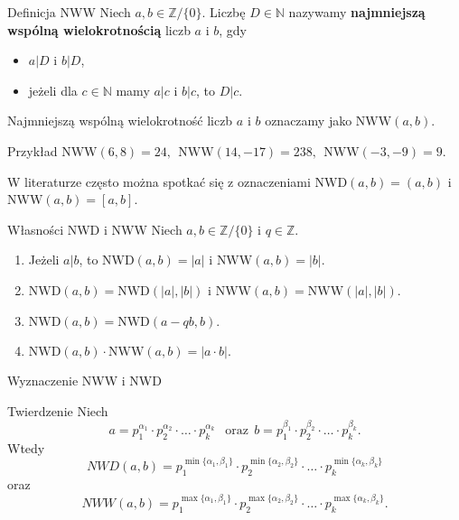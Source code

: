 \documentclass[a4paper,10pt]{beamer}
\begin{document}
\begin{frame}
	
	\begin{block}{Definicja NWW}
		Niech $a,b\in\mathbb{Z}/\{0\}$. Liczbę $D\in\mathbb{N}$ nazywamy {\bf najmniejszą wspólną wielokrotnością} liczb $a$ i $b$, gdy
		\begin{itemize}
			\item $a|D$ i $b|D$,
			\item jeżeli dla $c\in\mathbb{N}$ mamy $a|c$ i $b|c$, to $D|c$.
		\end{itemize}
	\end{block}
	
	Najmniejszą wspólną wielokrotność liczb $a$ i $b$ oznaczamy jako $\mbox{NWW}(a,b)$.
	
	\begin{exampleblock}{Przykład}
		$\mbox{NWW}(6,8)=24,\ \ \mbox{NWW}(14,-17)=238,\ \ \mbox{NWW}(-3,-9)=9.$
	\end{exampleblock}

	\begin{block}
				
		W literaturze często można spotkać się z oznaczeniami $\mbox{NWD}(a,b)=(a,b)$ i~$\mbox{NWW}(a,b)=[a,b]$.		
	\end{block}
	
\end{frame}



\begin{frame}
	
	\begin{block}{Własności NWD i NWW}
		Niech $a,b\in\mathbb{Z}/\{0\}$ i $q\in\mathbb{Z}$.
		\begin{enumerate}
			\item Jeżeli $a|b$, to $\mbox{NWD}(a,b)=|a|$ i $\mbox{NWW}(a,b)=|b|$.
			\item $\mbox{NWD}(a,b)=\mbox{NWD}(|a|,|b|)$ i $\mbox{NWW}(a,b)=\mbox{NWW}(|a|,|b|)$.
			\item $\mbox{NWD}(a,b)=\mbox{NWD}(a-qb,b)$.
			\item\label{mno} $\mbox{NWD}(a,b)\cdot\mbox{NWW}(a,b)=|a\cdot b|.$
		\end{enumerate}
	\end{block}
	
\end{frame}


\begin{frame}{Wyznaczenie NWW i NWD}
	
	\begin{block}{Twierdzenie}
		Niech $$a=p_{1}^{\alpha_{1}}\cdot p_{2}^{\alpha_{2}}\cdot\ldots\cdot p_{k}^{\alpha_{k}}\ \ \mbox{ oraz}\ \ b=p_{1}^{\beta_{1}}\cdot p_{2}^{\beta_{2}}\cdot\ldots\cdot p_{k}^{\beta_{k}}.$$
		Wtedy
		$$NWD(a,b)=p_{1}^{\min\{\alpha_1,\beta_1\}}\cdot p_{2}^{\min\{\alpha_2,\beta_2\}}\cdot\ldots\cdot p_{k}^{\min\{\alpha_k,\beta_k\}}$$
		oraz
		$$NWW(a,b)=p_{1}^{\max\{\alpha_1,\beta_1\}}\cdot p_{2}^{\max\{\alpha_2,\beta_2\}}\cdot\ldots\cdot p_{k}^{\max\{\alpha_k,\beta_k\}}.$$	
	\end{block}

\end{frame}
\end{document}
